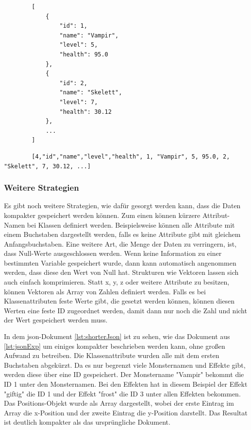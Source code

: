 \begin{listing}[htp]
    \begin{verbatim} 
        [
            {
                "id": 1,
                "name": "Vampir",
                "level": 5,
                "health": 95.0
            },
            {
                "id": 2,
                "name": "Skelett",
                "level": 7,
                "health": 30.12
            },
            ...
        ]                   
    \end{verbatim}
    \caption{}
    \label{lst:hpackJsonExp}
\end{listing}

\begin{listing}[htp]
    \begin{verbatim} 
        [4,"id","name","level","health", 1, "Vampir", 5, 95.0, 2, "Skelett", 7, 30.12, ...]                  
    \end{verbatim}
    \caption{}
    \label{lst:hpackCompressedExp}
\end{listing}

\subsubsection{Weitere Strategien}
Es gibt noch weitere Strategien, wie dafür gesorgt werden kann, dass die Daten kompakter gespeichert werden können. Zum einen können kürzere Attribut-Namen bei Klassen definiert werden. Beispielsweise können alle Attribute mit einem Buchstaben dargestellt werden, falls es keine Attribute gibt mit gleichem Anfangsbuchstaben. Eine weitere Art, die Menge der Daten zu verringern, ist, dass Null-Werte ausgeschlossen werden. Wenn keine Information zu einer bestimmten Variable gespeichert wurde, dann kann automatisch angenommen werden, dass diese den Wert von Null hat. Strukturen wie Vektoren lassen sich auch einfach komprimieren. Statt x, y, z oder weitere Attribute zu besitzen, können Vektoren als Array von Zahlen definiert werden. Falls es bei Klassenattributen feste Werte gibt, die gesetzt werden können, können diesen Werten eine feste ID zugeordnet werden, damit dann nur noch die Zahl und nicht der Wert gespeichert werden muss.\cite{objelean2011json}\cite{baeldungReducingJSON}

In dem \ac{json}-Dokument \ref{lst:shorterJson} ist zu sehen, wie das Dokument aus \ref{lst:jsonExp} um einiges kompakter beschrieben werden kann, ohne großen Aufwand zu betreiben. Die Klassenattribute wurden alle mit dem ersten Buchstaben abgekürzt. Da es nur begrenzt viele Monsternamen und Effekte gibt, werden diese über eine ID gespeichert. Der Monstername "Vampir" bekommt die ID 1 unter den Monsternamen. Bei den Effekten hat in diesem Beispiel der Effekt "giftig" die ID 1 und der Effekt "frost" die ID 3 unter allen Effekten bekommen. Das Positions-Objekt wurde als Array dargestellt, wobei der erste Eintrag im Array die x-Position und der zweite Eintrag die y-Position darstellt. Das Resultat ist deutlich kompakter als das ursprüngliche Dokument.

